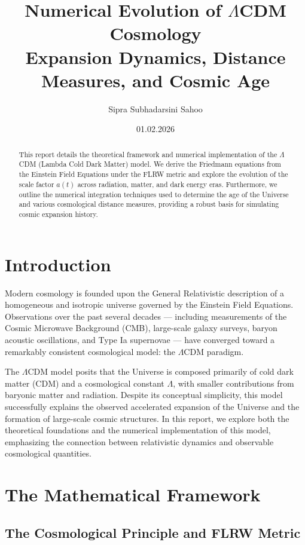 \documentclass[12pt, a4paper]{article}
\title{\textbf{Numerical Evolution of $\Lambda$CDM Cosmology}\\ \large Expansion Dynamics, Distance Measures, and Cosmic Age}
\author{Sipra Subhadarsini Sahoo}
\date{01.02.2026}
\begin{document}
\maketitle

\begin{abstract}
This report details the theoretical framework and numerical implementation of the $\Lambda$CDM (Lambda Cold Dark Matter) model. We derive the Friedmann equations from the Einstein Field Equations under the FLRW metric and explore the evolution of the scale factor $a(t)$ across radiation, matter, and dark energy eras. Furthermore, we outline the numerical integration techniques used to determine the age of the Universe and various cosmological distance measures, providing a robust basis for simulating cosmic expansion history.
\end{abstract}

\tableofcontents
\newpage

\section{Introduction}

Modern cosmology is founded upon the General Relativistic description of a homogeneous and isotropic universe governed by the Einstein Field Equations. Observations over the past several decades — including measurements of the Cosmic Microwave Background (CMB), large-scale galaxy surveys, baryon acoustic oscillations, and Type Ia supernovae — have converged toward a remarkably consistent cosmological model: the $\Lambda$CDM paradigm.

The $\Lambda$CDM model posits that the Universe is composed primarily of cold dark matter (CDM) and a cosmological constant $\Lambda$, with smaller contributions from baryonic matter and radiation. Despite its conceptual simplicity, this model successfully explains the observed accelerated expansion of the Universe and the formation of large-scale cosmic structures. In this report, we explore both the theoretical foundations and the numerical implementation of this model, emphasizing the connection between relativistic dynamics and observable cosmological quantities.


\section{The Mathematical Framework}

\subsection{The Cosmological Principle and FLRW Metric}
\end{document}

